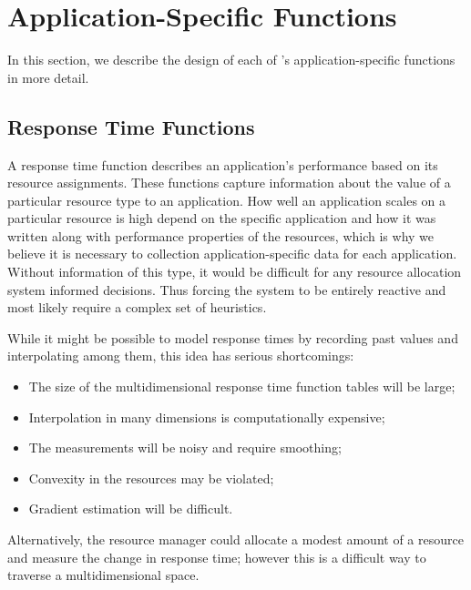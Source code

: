 \section{Application-Specific Functions}\label{app_func}


In this section, we describe the design of each of \pacora's application-specific functions in more detail.

\subsection*{Response Time Functions}

A response time function describes an application's performance based on its resource assignments.  These functions capture information about the value of a particular resource type to an application.  How well an application scales on a particular resource is high depend on the specific application and how it was written along with performance properties of the resources, which is why we believe it is necessary to collection application-specific data for each application. Without information of this type, it would be difficult for any resource allocation system informed decisions.  Thus forcing the system to be entirely reactive and most likely require a complex set of heuristics.  

While it might be possible to model response times by recording past values and interpolating among them, this idea has serious shortcomings:
\begin{itemize}
\item The size of the multidimensional response time function tables will be large;
\item Interpolation in many dimensions is computationally expensive;
\item The measurements will be noisy and require smoothing;
\item Convexity in the resources may be violated;
\item Gradient estimation will be difficult.
\end{itemize}
Alternatively, the resource manager could allocate a modest amount of a resource and measure the change in response time; however this is a difficult way to traverse a multidimensional space.

